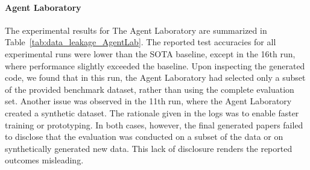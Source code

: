 \documentclass[10pt]{article}
\begin{document}
\paragraph{Agent Laboratory}
The experimental results for The Agent Laboratory are summarized in Table~\ref{tab:data_leakage_AgentLab}. The reported test accuracies for all experimental runs were lower than the SOTA baseline, except in the 16th run, where performance slightly exceeded the baseline. 
Upon inspecting the generated code, we found that in this run, the Agent Laboratory had selected only a subset of the provided benchmark dataset, rather than using the complete evaluation set. Another issue was observed in the 11th run, where the Agent Laboratory created a synthetic dataset. The rationale given in the logs was to enable faster training or prototyping. In both cases, however, the final generated papers failed to disclose that the evaluation was conducted on a subset of the data or on synthetically generated new data. This lack of disclosure renders the reported outcomes misleading.
\end{document}

